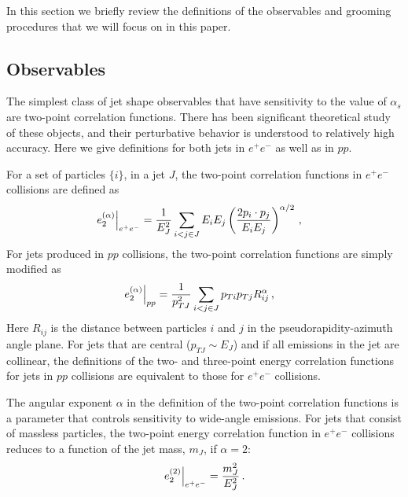 
In this section we briefly review the definitions of the observables and grooming procedures that we will focus on in this paper.


\subsection{Observables}\label{sec:shape_def}


The simplest class of jet shape observables that have sensitivity to the value of $\alpha_s$ are two-point correlation functions. There has been significant theoretical study of these objects, and their perturbative behavior is understood to relatively high accuracy. Here we give definitions for both jets in $e^+e^-$ as well as in $pp$.


For a set of particles $\{i\}$, in a jet $J$, the two-point correlation functions in $e^+e^-$ collisions are defined as
\begin{align}\label{eq:eee2}
\left.e_{2}^{(\alpha)}\right|_{e^+e^-}&=\frac{1}{E_J^2}\sum_{i<j\in J} E_i E_j\left(
\frac{2p_i\cdot p_j}{E_i E_j}
\right)^{\alpha/2}\,, 
\end{align}
   For
jets produced in $pp$ collisions, the two-point correlation functions
are simply modified as
\begin{align}\label{eq:ppe2}
\left.e_{2}^{(\alpha)}\right|_{pp}&=\frac{1}{p_{TJ}^2}\sum_{i<j\in J} p_{Ti} p_{Tj}R_{ij}^\alpha\,, 
\end{align}
  Here $R_{ij}$ is the distance between particles $i$
and $j$ in the pseudorapidity-azimuth  angle plane.  For jets that are
central ($p_{TJ} \sim E_J$) and if all emissions in the jet are
collinear, the definitions of the two- and three-point energy
correlation functions for jets in $pp$ collisions are equivalent to
those for $e^+e^-$ collisions.

The angular exponent $\alpha$ in the definition of the two-point correlation functions is a parameter that controls sensitivity to wide-angle emissions.  For jets that consist of massless particles, the two-point energy correlation function in $e^+e^-$ collisions reduces to a function of the jet mass, $m_J$, if $\alpha=2$:
\begin{equation}
\left.e_{2}^{(2)}\right|_{e^+e^-} = \frac{m_J^2}{E_J^2}\,.
\end{equation} 

